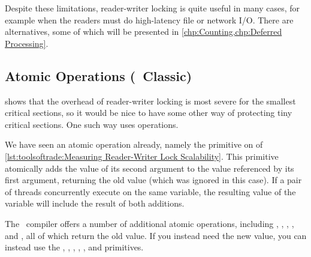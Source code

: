 Despite these limitations, reader-writer locking is quite useful in many
cases, for example when the readers must do high-latency file or network I/O\@.
There are alternatives, some of which will be presented in
\cref{chp:Counting,chp:Deferred Processing}.

\subsection{Atomic Operations (\GCC\ Classic)}
\label{sec:toolsoftrade:Atomic Operations (gcc Classic)}

shows that the overhead of reader-writer locking is most severe for the
smallest critical sections, so it would be nice to have some other way
of protecting tiny critical sections.
One such way uses  operations.
\begin{fcvref}
We have seen an atomic operation already, namely the
 primitive on  of
\cref{lst:toolsoftrade:Measuring Reader-Writer Lock Scalability}.
This primitive atomically adds the value of its second argument to
the value referenced by its first argument, returning the old value
(which was ignored in this case).
If a pair of threads concurrently execute  on
the same variable, the resulting value of the variable will include
the result of both additions.
\end{fcvref}

The \GNUC\ compiler offers a number of additional atomic operations,
including ,
,
,
, and
, all of which return the old value.
If you instead need the new value, you can instead use the
,
,
,
,
, and
 primitives.

\QuickQuizEnd

